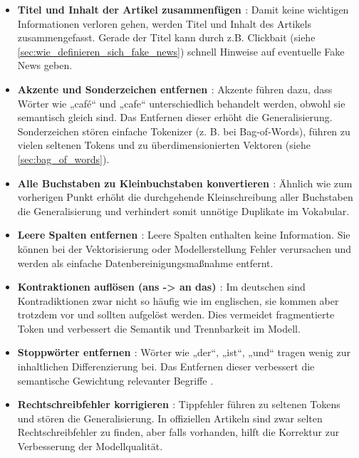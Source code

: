 \begin{itemize}
    \item \textbf{Titel und Inhalt der Artikel zusammenfügen \cite{Buddhadev2025}}: Damit keine wichtigen Informationen verloren gehen,
    werden Titel und Inhalt des Artikels zusammengefasst. Gerade der Titel kann durch z.B. Clickbait (siehe \ref{sec:wie_definieren_sich_fake_news})
    schnell Hinweise auf eventuelle Fake News geben.

    \item \textbf{Akzente und Sonderzeichen entfernen \cite{Buddhadev2025} \cite{sabir2025} \cite{aslam2022}}: Akzente führen dazu, dass Wörter wie „café“ und „cafe“ unterschiedlich behandelt werden, 
    obwohl sie semantisch gleich sind. Das Entfernen dieser erhöht die Generalisierung. Sonderzeichen stören einfache Tokenizer (z. B. bei Bag-of-Words), führen zu vielen seltenen Tokens und zu 
    überdimensionierten Vektoren (siehe \ref{sec:bag_of_words}).

    \item \textbf{Alle Buchstaben zu Kleinbuchstaben konvertieren \cite{sabir2025} \cite{SUDHAKAR2024101028} \cite{aslam2022}}: Ähnlich wie zum vorherigen Punkt
    erhöht die durchgehende Kleinschreibung aller Buchstaben die Generalisierung und verhindert somit unnötige Duplikate im Vokabular.

    \item \textbf{Leere Spalten entfernen \cite{SUDHAKAR2024101028}}: Leere Spalten enthalten keine Information. 
    Sie können bei der Vektorisierung oder Modellerstellung Fehler verursachen und werden als einfache Datenbereinigungsmaßnahme entfernt.

    \item \textbf{Kontraktionen auflösen (ans -> an das) \cite{Buddhadev2025}}: Im deutschen sind Kontradiktionen zwar nicht so häufig wie im englischen,
    sie kommen aber trotzdem vor und sollten aufgelöst werden. Dies vermeidet fragmentierte Token und verbessert die Semantik und Trennbarkeit im Modell.

    \item \textbf{Stoppwörter entfernen \cite{Buddhadev2025} \cite{sabir2025} \cite{aslam2022}}: Wörter wie „der“, „ist“, „und“ tragen wenig zur inhaltlichen Differenzierung bei. 
    Das Entfernen dieser verbessert die semantische Gewichtung relevanter Begriffe \cite{sarkar2018nlpguide}.

    \item \textbf{Rechtschreibfehler korrigieren \cite{sabir2025}}: Tippfehler führen zu seltenen Tokens und stören die Generalisierung. 
    In offiziellen Artikeln sind zwar selten Rechtschreibfehler zu finden, aber falls vorhanden, hilft die Korrektur zur Verbesserung
    der Modellqualität.


\end{itemize}
